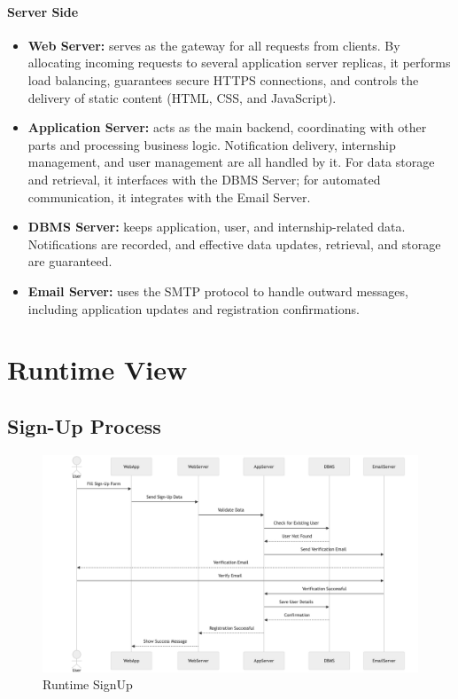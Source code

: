 \paragraph{Server Side}
\begin{itemize}
    \item \textbf{Web Server:} serves as the gateway for all requests from clients. By allocating incoming requests to several application server replicas, it performs load balancing, guarantees secure HTTPS connections, and controls the delivery of static content (HTML, CSS, and JavaScript).
    \item \textbf{Application Server:} acts as the main backend, coordinating with other parts and processing business logic. Notification delivery, internship management, and user management are all handled by it. For data storage and retrieval, it interfaces with the DBMS Server; for automated communication, it integrates with the Email Server.
    \item \textbf{DBMS Server:} keeps application, user, and internship-related data. Notifications are recorded, and effective data updates, retrieval, and storage are guaranteed.
    \item \textbf{Email Server:} uses the SMTP protocol to handle outward messages, including application updates and registration confirmations.
\end{itemize}

\section{Runtime View}
\label{sec:runtime_view}

\subsection{Sign-Up Process}
\label{subsec:signup_process}
\begin{figure}[H]
    \begin{center}
        \includegraphics[width=0.82\linewidth]{JhaBhatiaSharma/imagesDD/SignUpRuntime.png}
        \caption{Runtime SignUp}
        \label{fig:signupruntime}%
    \end{center}
\end{figure}


